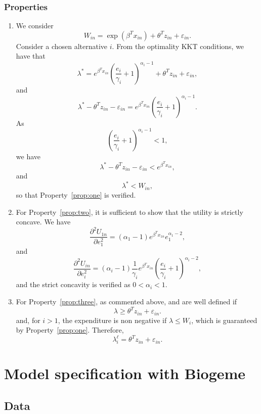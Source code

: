\documentclass[12pt,a4paper]{article}
\begin{document}
\subsubsection*{Properties}
\begin{enumerate}
    \item
We consider
\[
    W_{in}  =\exp(\beta^T x_{in}) + \theta^T z_{in} + \varepsilon_{in}.
\]
Consider a chosen alternative $i$. From the optimality KKT conditions, we have that
\begin{equation}
    \label{eq:non_mon_opt}
   \lambda^* =  e^{\beta^T x_{in}}  \left(\frac{e_i}{\gamma_i}+1\right)^{\alpha_i-1} + \theta^T z_{in} + \varepsilon_{in},
\end{equation}
and
\[
   \lambda^* - \theta^T z_{in} - \varepsilon_{in}=  e^{\beta^T x_{in}}  \left(\frac{e_i}{\gamma_i}+1\right)^{\alpha_i-1}.
\]
As
\[
     \left(\frac{e_i}{\gamma_i}+1\right)^{\alpha_i-1} < 1,
\]
we have
\[
     \lambda^* - \theta^T z_{in} - \varepsilon_{in} <  e^{\beta^T x_{in}},
\]
and
\[
    \lambda^* < W_{in},
\]
so that Property~\ref{prop:one} is verified.

\item For Property~\ref{prop:two}, it is sufficient to show that the utility is strictly concave.
We have
\[
    \frac{\partial^2 U_{1n}}{\partial e_1^2} = (\alpha_1-1)e^{\beta^T x_{1n}}  e_1^{\alpha_1-2},
\]
and
\[
    \frac{\partial^2 U_{in}}{\partial e_i^2} = (\alpha_i-1)\frac{1}{\gamma_i}e^{\beta^T x_{in}}  \left(\frac{e_i}{\gamma_i}+1\right)^{\alpha_i-2},
\]
and the strict concavity is verified as $0 < \alpha_i < 1$.

\item For Property~\ref{prop:three},  as commented above,  and  are
    well defined if
    \[
        \lambda \geq \theta^T z_{in} + \varepsilon_{in}.
    \]
    and, for $i>1$, the expenditure is non negative if $\lambda \leq W_i$, which is guaranteed by Property~\ref{prop:one}. Therefore,
    \[
        \lambda^{\ell}_i = \theta^T z_{in} + \varepsilon_{in}.
    \]
\end{enumerate}

\section{Model specification with Biogeme}

\subsection{Data}
\end{document}
